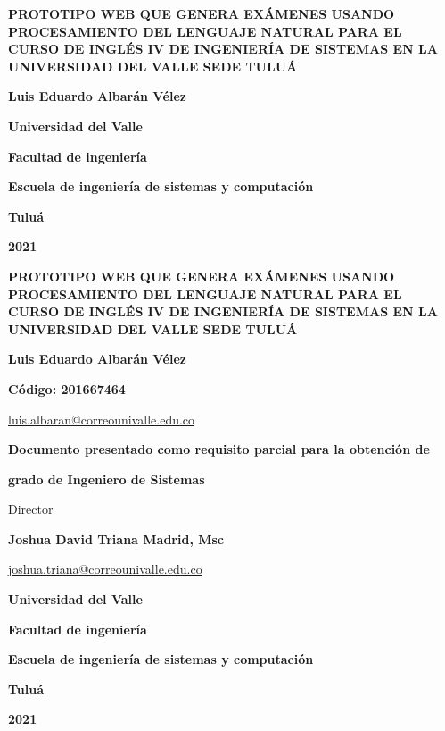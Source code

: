 \documentclass[../Main.tex]{subfiles}
\begin{document}
\thispagestyle{empty} %
\begin{center}

		{\bf PROTOTIPO WEB QUE GENERA EXÁMENES USANDO PROCESAMIENTO DEL LENGUAJE NATURAL PARA EL CURSO DE INGLÉS IV DE INGENIERÍA DE SISTEMAS EN LA UNIVERSIDAD DEL VALLE SEDE TULUÁ}
	    \vfill
		{\bf Luis Eduardo Albarán Vélez \par}
		\vfill
		{\bf Universidad del Valle  \par}
		{\bf Facultad de ingeniería \par}
		{\bf Escuela de ingeniería de sistemas y computación \par}
		{\bf Tuluá \par}
		{\bf 2021 \par}

\end{center}

\newpage
\thispagestyle{empty}
\begin{center}
	{\bf PROTOTIPO WEB QUE GENERA EXÁMENES USANDO PROCESAMIENTO DEL LENGUAJE NATURAL PARA EL CURSO DE INGLÉS IV DE INGENIERÍA DE SISTEMAS EN LA UNIVERSIDAD DEL VALLE SEDE TULUÁ}
		\vfill
		\vfill
		\vfill
		\vfill
		{\bf Luis Eduardo Albarán Vélez \par}
		{\bf Código: 201667464 \par}
		{\url{luis.albaran@correounivalle.edu.co} \par}
		\vfill
		\vfill
		\vfill
		\vfill
		{\bf Documento presentado como requisito parcial para la obtención de \par}
		{\bf grado de Ingeniero de Sistemas \par}
		\vfill
		\vfill
		\vfill
		\vfill
		{Director \par}
		{\bf Joshua David Triana Madrid, Msc \par}
		{\url{joshua.triana@correounivalle.edu.co} \par}
		\vfill
		\vfill
		\vfill
		\vfill
		{\bf Universidad del Valle  \par}
		{\bf Facultad de ingeniería \par}
		{\bf Escuela de ingeniería de sistemas y computación \par}
		{\bf Tuluá \par}
		{\bf 2021 \par}

\end{center}
\end{document}
